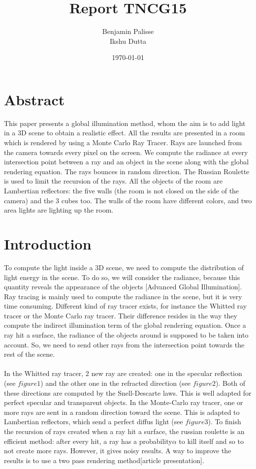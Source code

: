 \documentclass[12pt]{article}
\title{{Report TNCG15 }\\}
\author{Benjamin Palisse \\ Ikshu Dutta}
\date{\today}
\numberwithin{equation}{section}
\begin{document}
\maketitle

\section{Abstract}
This paper presents a global illumination method, whom the aim is to add light in a 3D scene to obtain a realistic effect. All the results are presented in a room which is rendered by using a Monte Carlo Ray Tracer. Rays are launched from the camera towards every pixel on the screen. We compute the radiance at every intersection point between a ray and an object in the scene along with the global rendering equation. The rays bounces in random direction. The Russian Roulette is used to limit the recursion of the rays. All the objects of the room are Lambertian reflectors: the five walls (the room is not closed on the side of the camera) and the 3 cubes too. The walls of the room have different colors, and two area lights  are lighting up the room.

\section{Introduction}

To compute the light inside a 3D scene, we need to compute the distribution of light energy in the scene. To do so, we will consider the radiance, because this quantity reveals the appearance of the objects [Advanced Global Illumination]. Ray tracing is mainly used to compute the radiance in the scene, but it is very time consuming. Different kind of ray tracer exists, for instance the Whitted ray tracer or the Monte Carlo ray tracer. Their difference resides in the way they compute the indirect illumination term of the global rendering equation. Once a ray hit a surface, the radiance of the objects around is supposed to be taken into account. So, we need to send other rays from the intersection point towards the rest of the scene.\\
\\
In the Whitted ray tracer, 2 new ray are created: one in the specular reflection (see $figure 1$) and the other one in the refracted direction (see $figure 2$). Both of these directions are computed by the Snell-Descarte laws. This is well adapted for perfect specular and transparent objects.
In the Monte-Carlo ray tracer, one or more rays are sent in a random direction toward the scene. This is adapted to Lambertian reflectors, which send a perfect diffus light (see $figure 3$). To finish the recursion of rays created when a ray hit a surface, the russian roulette is an efficient method: after every hit, a ray has a probability$\alpha$ to kill itself and so to not create more rays. However, it gives noisy results. A way to improve the results is to use a two pass rendering method[article presentation].\\
\end{document}
